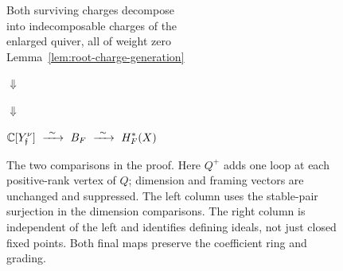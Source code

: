 \begin{figure}[hbp]
\begin{minipage}[t]{0.47\textwidth}
{{Both surviving charges decompose\\
into indecomposable charges of the\\
enlarged quiver, all of weight zero\\
Lemma~\ref{lem:root-charge-generation}}}
\par\smallskip$\Downarrow$\par\smallskip
{}
\par\smallskip$\Downarrow$\par\smallskip
{}
\end{minipage}
\par\bigskip
$\displaystyle
 \mathbb C[Y_{\mathfrak f}^{\nu}]\ \xrightarrow{\ \sim\ }\
 B_F\ \xrightarrow{\ \sim\ }\ H_F^*(X)$
\endgroup
\caption{The two comparisons in the proof.  Here $Q^+$ adds one loop at
each positive-rank vertex of $Q$; dimension and framing vectors are
unchanged and suppressed.  The left column uses the stable-pair
surjection in the dimension comparisons.  The right column is
independent of the left and identifies defining ideals, not just closed
fixed points.  Both final maps preserve the coefficient ring and grading.}
\label{fig:proof-route}
\end{figure}
